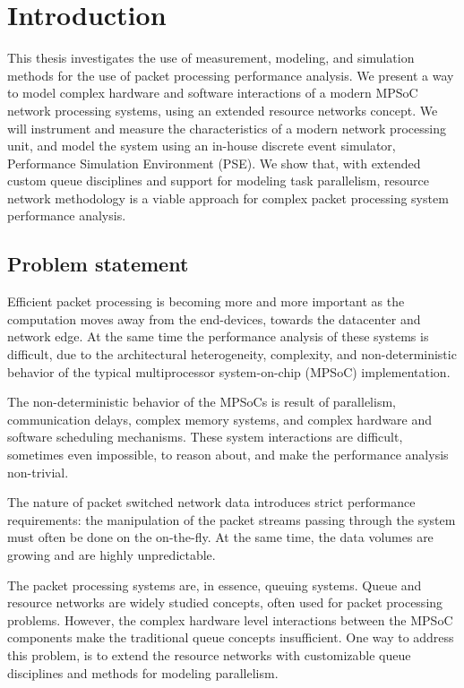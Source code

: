 \chapter{Introduction}
\label{chapter:intro}
This thesis investigates the use of measurement, modeling, and simulation methods for the use of packet processing performance analysis. We present a way to model complex hardware and software interactions of a modern MPSoC network processing systems, using an extended resource networks concept. We will instrument and measure the characteristics of a modern network processing unit, and model the system using an in-house discrete event simulator, Performance Simulation Environment (PSE). We show that, with extended custom queue disciplines and support for modeling task parallelism, resource network methodology is a viable approach for complex packet processing system performance analysis.



\section{Problem statement}
Efficient packet processing is becoming more and more important as the computation moves away from the end-devices, towards the datacenter and network edge. At the same time the performance analysis of these systems is difficult, due to the architectural heterogeneity, complexity, and non-deterministic behavior of the typical multiprocessor system-on-chip (MPSoC) implementation.

The non-deterministic behavior of the MPSoCs is result of parallelism, communication delays, complex memory systems, and complex hardware and software scheduling mechanisms. These system interactions are difficult, sometimes even impossible, to reason about, and make the performance analysis non-trivial.

The nature of packet switched network data introduces strict performance requirements: the manipulation of the packet streams passing through the system must often be done on the on-the-fly. At the same time, the data volumes are growing and are highly unpredictable.

The packet processing systems are, in essence, queuing systems. Queue and resource networks are widely studied concepts, often used for packet processing problems. However, the complex hardware level interactions between the MPSoC components make the traditional queue concepts insufficient. One way to address this problem, is to extend the resource networks with customizable queue disciplines and methods for modeling parallelism.

